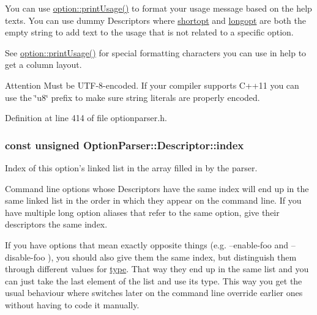 You can use \hyperlink{namespace_option_parser_a2458d437c7f439220d0b3581a5db56b1}{option\-::print\-Usage()} to format your usage message based on the {\ttfamily help} texts. You can use dummy Descriptors where \hyperlink{struct_option_parser_1_1_descriptor_a21415d74531b006e9a7a06ccadbd2721}{shortopt} and \hyperlink{struct_option_parser_1_1_descriptor_ab9db8207bae68dd5c4ee83e05189a9d0}{longopt} are both the empty string to add text to the usage that is not related to a specific option.

See \hyperlink{namespace_option_parser_a2458d437c7f439220d0b3581a5db56b1}{option\-::print\-Usage()} for special formatting characters you can use in {\ttfamily help} to get a column layout.

\begin{DoxyAttention}{Attention}
Must be U\-T\-F-\/8-\/encoded. If your compiler supports C++11 you can use the \char`\"{}u8\char`\"{} prefix to make sure string literals are properly encoded. 
\end{DoxyAttention}


Definition at line 414 of file optionparser.\-h.

\hypertarget{struct_option_parser_1_1_descriptor_ae62860781844b44c0bd4f730c96701d7}{
\subsubsection[{index}]{\setlength{\rightskip}{0pt plus 5cm}const unsigned Option\-Parser\-::\-Descriptor\-::index}}\label{struct_option_parser_1_1_descriptor_ae62860781844b44c0bd4f730c96701d7}


Index of this option's linked list in the array filled in by the parser. 

Command line options whose Descriptors have the same index will end up in the same linked list in the order in which they appear on the command line. If you have multiple long option aliases that refer to the same option, give their descriptors the same {\ttfamily index}.

If you have options that mean exactly opposite things (e.\-g. {\ttfamily --enable-\/foo} and {\ttfamily --disable-\/foo} ), you should also give them the same {\ttfamily index}, but distinguish them through different values for \hyperlink{struct_option_parser_1_1_descriptor_a070d24a33fc9f30cf3deafa428ff7fa7}{type}. That way they end up in the same list and you can just take the last element of the list and use its type. This way you get the usual behaviour where switches later on the command line override earlier ones without having to code it manually.

